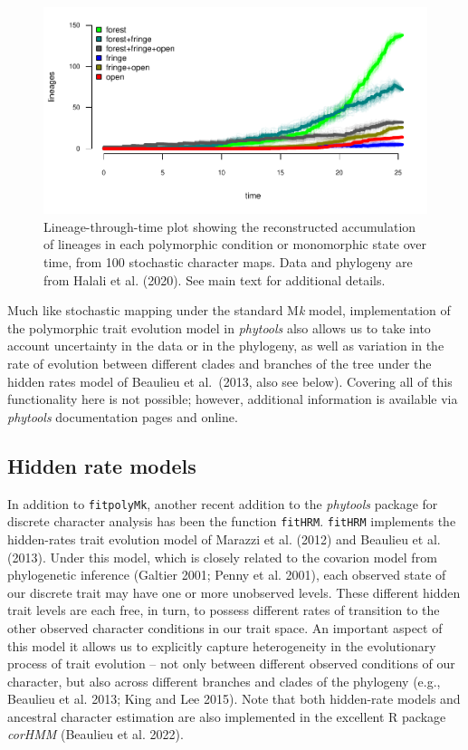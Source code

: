 \documentclass[fleqn,10pt,lineno]{wlpeerj} %
\begin{document}
\begin{figure}
\includegraphics[width=1\linewidth]{Revell.phytools-v2_peerj_files/figure-latex/ltt-fitpolyMk-1} \caption{Lineage-through-time plot showing the reconstructed accumulation of lineages in each polymorphic condition or monomorphic state over time, from 100 stochastic character maps. Data and phylogeny are from Halali et al. (2020). See main text for additional details.}\label{fig:ltt-fitpolyMk}
\end{figure}

Much like stochastic mapping under the standard M\emph{k} model, implementation of the polymorphic trait evolution model in \emph{phytools} also allows us to take into account uncertainty in the data or in the phylogeny, as well as variation in the rate of evolution between different clades and branches of the tree under the hidden rates model of Beaulieu et al.~(2013, also see below). Covering all of this functionality here is not possible; however, additional information is available via \emph{phytools} documentation pages and online.

\hypertarget{hidden-rate-models}{%
\subsection{Hidden rate models}\label{hidden-rate-models}}

In addition to \texttt{fitpolyMk}, another recent addition to the \emph{phytools} package for discrete character analysis has been the function \texttt{fitHRM}. \texttt{fitHRM} implements the hidden-rates trait evolution model of Marazzi et al. (2012) and Beaulieu et al. (2013). Under this model, which is closely related to the covarion model from phylogenetic inference (Galtier 2001; Penny et al. 2001), each observed state of our discrete trait may have one or more unobserved levels. These different hidden trait levels are each free, in turn, to possess different rates of transition to the other observed character conditions in our trait space. An important aspect of this model it allows us to explicitly capture heterogeneity in the evolutionary process of trait evolution -- not only between different observed conditions of our character, but also across different branches and clades of the phylogeny (e.g., Beaulieu et al. 2013; King and Lee 2015). Note that both hidden-rate models and ancestral character estimation are also implemented in the excellent R package \emph{corHMM} (Beaulieu et al. 2022).
\end{document}
